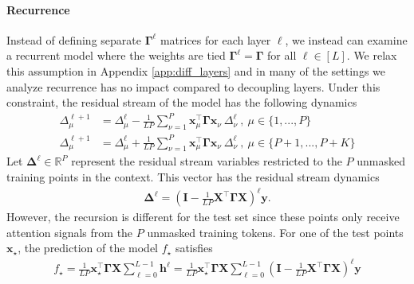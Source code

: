 \documentclass{article} %
\def\x{\bm x}
\begin{document}
\paragraph{Recurrence} Instead of defining separate $\bm\Gamma^\ell$ matrices for each layer $\ell$, we instead can examine a recurrent model where the weights are tied $\bm\Gamma^\ell = \bm\Gamma$ for all $\ell \in [L]$. We relax this assumption in Appendix \ref{app:diff_layers} and in many of the settings we analyze recurrence has no impact compared to decoupling layers. Under this constraint, the residual stream of the model has the following dynamics
\begin{align}
    \Delta_\mu^{\ell+1} &= \Delta^\ell_{\mu} - \frac{1}{L P} \sum_{\nu=1}^P \bm x_\mu^\top \bm \Gamma \bm x_\nu  \ \Delta^\ell_\nu \ , \ \mu \in \{1,...,P\} \nonumber
    \\
    \Delta_\mu^{\ell+1} &= \Delta_\mu^\ell + \frac{1}{L P} \sum_{\nu =1}^P \bm x_\mu^\top \bm \Gamma \bm x_\nu  \ \Delta^\ell_\nu \ , \ \mu \in \{P+1,...,P+K\}
\end{align}
Let $\bm \Delta^\ell \in \mathbb{R}^P$ represent the residual stream variables restricted to the $P$ unmasked training points in the context. This vector has the residual stream dynamics
\begin{align}
    \bm \Delta^{\ell} = \left( \bm I -   \frac{1}{L P} \bm X^\top \bm \Gamma \bm X \right)^\ell \bm y  .
\end{align}
However, the recursion is different for the test set since these points only receive attention signals from the $P$ unmasked training tokens. For one of the test points $\x_\star$, the prediction of the model $f_\star$ satisfies
\begin{align}
     f_\star = \frac{1}{L P}  \bm x_\star^\top \bm\Gamma \bm X  \sum_{\ell=0}^{L-1} \bm h^\ell = \frac{1}{L P}  \bm x_\star^\top \bm\Gamma \bm X  \sum_{\ell=0}^{L-1} \left( \bm I -   \frac{1}{L
     P} \bm X^\top \bm \Gamma \bm X \right)^\ell \bm y
\end{align}
\end{document}
